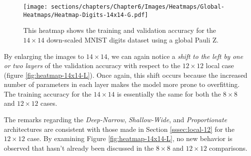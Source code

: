 \begin{figure}[h]
    \centering
    \texttt{[image: sections/chapters/Chapter6/Images/Heatmaps/Global-Heatmaps/Heatmap-Digits-14x14-G.pdf]}
    \caption{This heatmap shows the training and validation accuracy for the $14\times14$ 
    down-scaled MNIST digits dataset using a global Pauli Z.}
    \label{fig:heatmap-14x14-G}
\end{figure}


By enlarging the images to $14\times14$, we can again notice a \textit{shift to the left by 
one or two layers} of the validation accuracy with respect to the $12\times12$ local case (figure 
\ref{fig:heatmap-14x14-L}). Once again, this shift 
occurs because the increased number of parameters in each layer makes the model more prone to overfitting.
The training accuracy for the $14\times14$ is essentially the same for both the $8\times8$ and 
$12\times12$ cases.

The remarks regarding the \textit{Deep-Narrow}, \textit{Shallow-Wide}, and \textit{Proportionate} 
architectures are consistent with those made in Section \ref{sssec:local-12} for the $12\times12$ case.
By examining Figure \ref{fig:heatmap-14x14-L}, no new behavior is observed that hasn't already 
been discussed in the $8\times8$ and $12\times12$ comparisons.